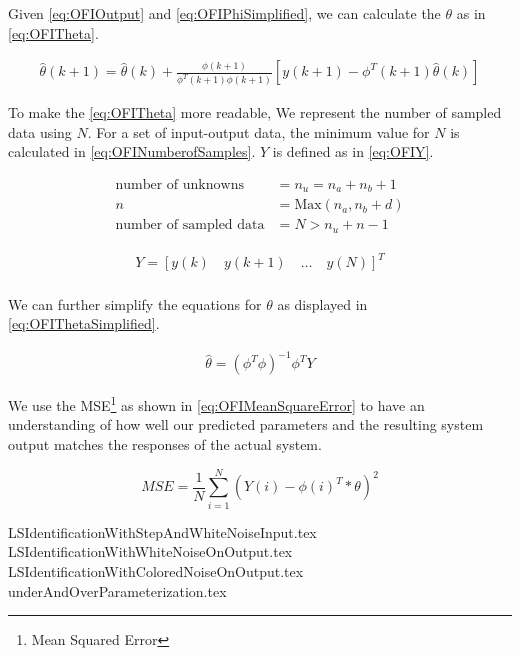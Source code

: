 \noindent Given \autoref{eq:OFIOutput} and \autoref{eq:OFIPhiSimplified}, we can calculate the $\theta$ as in \autoref{eq:OFITheta}.

\begin{equation}
	\begin{gathered}
		\hat{\theta}(k+1) = \hat{\theta}(k) + \frac{\phi(k+1)}{\phi^T(k+1)\phi(k+1)} [y(k+1) - \phi^T(k+1)\hat{\theta}(k)]
	\end{gathered}
	\label{eq:OFITheta}
\end{equation}

To make the \autoref{eq:OFITheta} more readable, We represent the number of sampled data using $N$. For a set of input-output data, the minimum value for $N$ is calculated in \autoref{eq:OFINumberofSamples}. $Y$ is defined as in \autoref{eq:OFIY}. 

\begin{equation}
	\begin{aligned}
		\text{number of unknowns} &= n_u = n_a + n_b + 1 \\
		n &= \text{Max}(n_a, n_b + d) \\
		\text{number of sampled data} &= N > n_u + n - 1
	\end{aligned}
	\label{eq:OFINumberofSamples}
\end{equation}

\begin{equation}
	\begin{gathered}
		Y = [y(k) \quad y(k+1) \quad \dots \quad y(N)]^T \\
	\end{gathered}
	\label{eq:OFIY}
\end{equation}

\noindent We can further simplify the equations for $\theta$ as displayed in \autoref{eq:OFIThetaSimplified}.

\begin{equation}
	\begin{gathered}
		\hat{\theta} = (\phi^T \phi)^{-1} \phi^T Y
	\end{gathered}
	\label{eq:OFIThetaSimplified}
\end{equation}

We use the MSE\footnote{Mean Squared Error} as shown in \autoref{eq:OFIMeanSquareError} to have an understanding of how well our predicted parameters and the resulting system output matches the responses of the actual system.

\begin{equation}
	MSE = \frac{1}{N} \sum_{i=1}^{N} (Y(i) - \phi(i)^T*\theta)^2
	\label{eq:OFIMeanSquareError}
\end{equation}

{LSIdentificationWithStepAndWhiteNoiseInput.tex}
{LSIdentificationWithWhiteNoiseOnOutput.tex}
{LSIdentificationWithColoredNoiseOnOutput.tex}
{underAndOverParameterization.tex}
